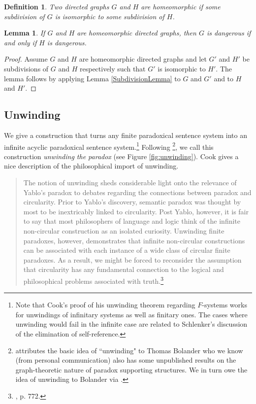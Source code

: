 \documentclass[12pt]{kluwer}
\newtheorem{lem}[thm]{Lemma}
\newtheorem{defn}{Definition}
\theoremstyle{remark}
\begin{document}
\begin{defn}
Two directed graphs $G$ and $H$ are \emph{homeomorphic} if some subdivision of $G$ is isomorphic to some subdivision of $H$.
\end{defn}

\begin{lem}
If $G$ and $H$ are homeomorphic directed graphs, then $G$ is dangerous if and only if $H$ is dangerous.
\end{lem}
\begin{proof}
Assume $G$ and $H$ are homeomorphic directed graphs and let $G'$ and $H'$ be subdivisions of $G$ and $H$ respectively such that $G'$ is isomorphic to $H'$. The lemma follows by applying Lemma \ref{SubdivisionLemma} to $G$ and $G'$ and to $H$ and $H'$.
\end{proof}

\subsection{Unwinding}
We give a construction that turns any finite paradoxical sentence system into an infinite acyclic paradoxical sentence system.\footnote{Note that Cook's \cite{cook} proof of his unwinding theorem regarding $F$-systems works for unwindings of infinitary systems as well as finitary ones. The cases where unwinding would fail in the infinite case are related to Schlenker's \cite{schlenker2007elimination} discussion of the elimination of self-reference.}  Following \cite{cook}\footnote{\cite{cook} attributes the basic idea of ``unwinding" to Thomas Bolander who we know (from personal communication) also has some unpublished results on the graph-theoretic nature of paradox supporting structures. We in turn owe the idea of unwinding to Bolander via \cite{cook}.}, we call this construction \textit{unwinding the paradox} (see Figure \ref{fig:unwinding}). Cook gives a nice description of the philosophical import of unwinding.

\begin{quote}
The notion of unwinding sheds considerable light onto the relevance of Yablo's paradox to debates regarding the connections between paradox and circularity. Prior to Yablo's discovery, semantic paradox was thought by most to be inextricably linked to circularity.  Post Yablo, however, it is fair to say that most philosophers of language and logic think of the infinite non-circular construction as an isolated curiosity. Unwinding finite paradoxes, however, demonstrates that infinite non-circular constructions can be associated with each instance of a wide class of circular finite paradoxes. As a result, we might be forced to reconsider the assumption that circularity has any fundamental connection to the logical and philosophical problems associated with truth.\footnote{\cite{cook}, p. 772.}
\end{quote}
\end{document}
